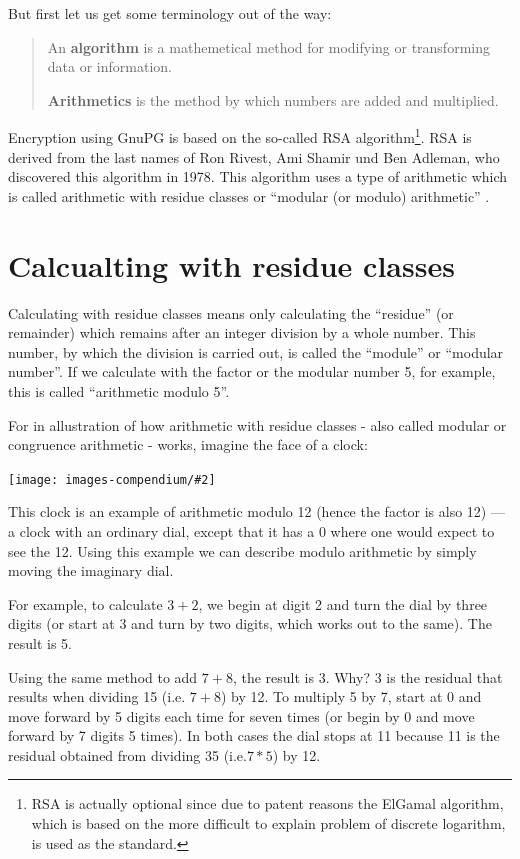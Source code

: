 \documentclass[a4paper,11pt,oneside,openright,titlepage]{scrbook}
\newcommand{\IncludeImage}[2][]{
\begin{center}
  \texttt{[image: images-compendium/\#2]}%
\end{center}
}
\begin{document}
But first let us get some terminology out of the way:

\begin{quote}
    An \textbf{algorithm} is a mathemetical method for modifying or
    transforming data or information.

    \textbf{Arithmetics} is the method by which numbers are added and
    multiplied.
\end{quote}

Encryption using GnuPG is based on the so-called RSA
algorithm\footnote{RSA is actually optional since due to patent
reasons the ElGamal algorithm, which is based on the more difficult to
explain problem of discrete logarithm, is used as the standard.}.  RSA
is derived from the last names of Ron Rivest, Ami Shamir und Ben
Adleman, who discovered this algorithm in 1978. This algorithm uses a
type of arithmetic which is called arithmetic with residue classes or
``modular (or modulo) arithmetic'' .

\clearpage
\section{Calcualting with residue classes}

Calculating with residue classes means only calculating the
``residue'' (or remainder) which remains after an integer division by
a whole number.  This number, by which the division is carried out, is
called the  ``module'' or ``modular number''. If we calculate with the
factor or the modular number 5, for example, this is called
``arithmetic modulo 5''.

For in allustration of how arithmetic with residue classes - also
called modular or congruence arithmetic - works, imagine the face of a
clock:



\IncludeImage[width=0.5\textwidth]{clock-face}

This clock is an example of arithmetic modulo 12 (hence the factor is
also 12) --- a clock with an ordinary dial, except that it has a 0
where one would expect to see the 12. Using this example we can
describe modulo arithmetic by simply moving the imaginary dial.

For example, to calculate $3 + 2$, we begin at digit 2 and turn the
dial by three digits (or start at 3 and turn by two digits, which
works out to the same). The result is 5.

Using the same method to add $7 + 8$, the result is 3. Why? 3 is the
residual that results when dividing 15 (i.e. $7 + 8$) by 12. To
multiply 5 by 7, start at 0 and move forward by 5 digits each time for
seven times (or begin by 0 and move forward by 7 digits 5 times). In
both cases the dial stops at 11 because 11 is the residual obtained
from dividing 35 (i.e.$7 * 5$) by 12.
\end{document}
